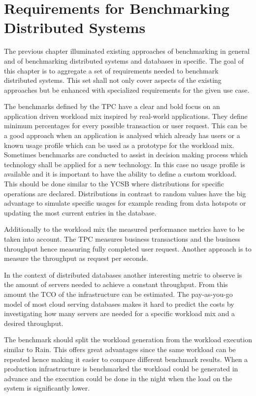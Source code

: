 
\chapter{Requirements for Benchmarking Distributed Systems}
\label{cha:requirements}
The previous chapter illuminated existing approaches of benchmarking in general and of benchmarking distributed systems and databases in specific. The goal of this chapter is to aggregate a set of requirements needed to benchmark distributed systems. This set shall not only cover aspects of the existing approaches but be enhanced with specialized requirements for the given use case.

The benchmarks defined by the \ac{TPC} have a clear and bold focus on an application driven workload mix inspired by real-world applications. They define minimum percentages for every possible transaction or user request. This can be a good approach when an application is analysed which already has users or a known usage profile which can be used as a prototype for the workload mix. Sometimes benchmarks are conducted to assist in decision making process which technology shall be applied for a new technology. In this case no usage profile is available and it is important to have the ability to define a custom workload. This should be done similar to the YCSB where distributions for specific operations are declared. Distributions in contrast to random values have the big advantage to simulate specific usages for example reading from data hotspots or updating the most current entries in the database.

Additionally to the workload mix the measured performance metrics have to be taken into account. The \ac{TPC} measures business transactions and the business throughput hence measuring fully completed user request. Another approach is to measure the throughput as request per seconds.

In the context of distributed databases another interesting metric to observe is the amount of servers needed to achieve a constant throughput. From this amount the \ac{TCO} of the infrastructure can be estimated. The pay-as-you-go model of most cloud serving databases makes it hard to predict the costs by investigating how many servers are needed for a specific workload mix and a desired throughput.

The benchmark should split the workload generation from the workload execution similar to Rain. This offers great advantages since the same workload can be repeated hence making it easier to compare different benchmark results. When a production infrastructure is benchmarked the workload could be generated in advance and the execution could be done in the night when the load on the system is significantly lower.


